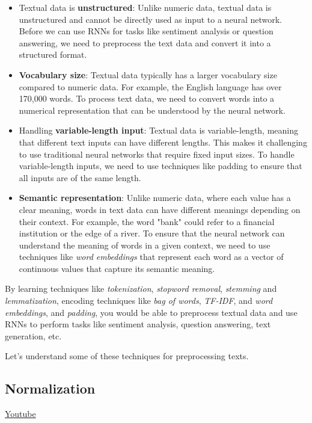 \begin{itemize}
    \item Textual data is \textbf{unstructured}: Unlike numeric data, textual data is unstructured and cannot be directly used as input to a neural network. Before we can use RNNs for tasks like sentiment analysis or question answering, we need to preprocess the text data and convert it into a structured format.
    \item \textbf{Vocabulary size}: Textual data typically has a larger vocabulary size compared to numeric data. For example, the English language has over 170,000 words. To process text data, we need to convert words into a numerical representation that can be understood by the neural network.
    \item Handling \textbf{variable-length input}: Textual data is variable-length, meaning that different text inputs can have different lengths. This makes it challenging to use traditional neural networks that require fixed input sizes. To handle variable-length inputs, we need to use techniques like padding to ensure that all inputs are of the same length.
    \item \textbf{Semantic representation}: Unlike numeric data, where each value has a clear meaning, words in text data can have different meanings depending on their context. For example, the word "bank" could refer to a financial institution or the edge of a river. To ensure that the neural network can understand the meaning of words in a given context, we need to use techniques like \textit{word embeddings} that represent each word as a vector of continuous values that capture its semantic meaning.
\end{itemize}
By learning techniques like \textit{tokenization}, \textit{stopword removal}, \textit{stemming} and \textit{lemmatization}, encoding techniques like \textit{bag of words}, \textit{TF-IDF}, and \textit{word embeddings}, and \textit{padding}, you would be able to preprocess textual data and use RNNs to perform tasks like sentiment analysis, question answering, text generation, etc.

Let's understand some of these techniques for preprocessing texts.

\subsection{Normalization}
\href{https://www.youtube.com/watch?v=eOV2UUY8vtM&ab_channel=Udacity}{Youtube} \newline

